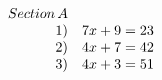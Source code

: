 \documentclass[preview]{standalone}
\begin{document}
\begin{align*}
\begin{array}{r l}{S e c t i o n\,A}\\ {1)}&{{}7x+9=23}\\ {2)}&{{}4x+7=42}\\ {3)}&{{}4x+3=51}\end{array}
\end{align*}
\end{document}
